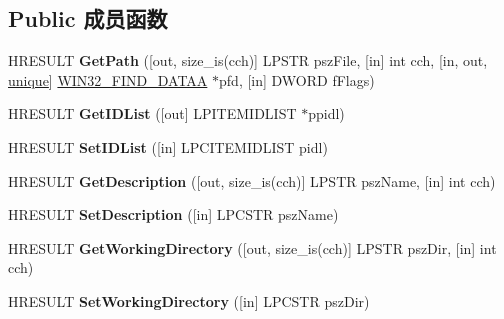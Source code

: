 \subsection*{Public 成员函数}
\begin{DoxyCompactItemize}
\item 
\mbox{\label{interface_i_shell_link_a_a39f61205c0352dbd8d60c6cbbc35930c}} 
H\+R\+E\+S\+U\+LT {\bfseries Get\+Path} (\mbox{[}out, size\+\_\+is(cch)\mbox{]} L\+P\+S\+TR psz\+File, \mbox{[}in\mbox{]} int cch, \mbox{[}in, out, \hyperlink{interfaceunique}{unique}\mbox{]} \hyperlink{struct_w_i_n32___f_i_n_d___d_a_t_a_a}{W\+I\+N32\+\_\+\+F\+I\+N\+D\+\_\+\+D\+A\+T\+AA} $\ast$pfd, \mbox{[}in\mbox{]} D\+W\+O\+RD f\+Flags)
\item 
\mbox{\label{interface_i_shell_link_a_a7089cc784350b3a8fe15ef9f508ab43a}} 
H\+R\+E\+S\+U\+LT {\bfseries Get\+I\+D\+List} (\mbox{[}out\mbox{]} L\+P\+I\+T\+E\+M\+I\+D\+L\+I\+ST $\ast$ppidl)
\item 
\mbox{\label{interface_i_shell_link_a_a708dd593d255147a3207a9daf727be41}} 
H\+R\+E\+S\+U\+LT {\bfseries Set\+I\+D\+List} (\mbox{[}in\mbox{]} L\+P\+C\+I\+T\+E\+M\+I\+D\+L\+I\+ST pidl)
\item 
\mbox{\label{interface_i_shell_link_a_a430c1d87198396dea6d8cc32d1e76d52}} 
H\+R\+E\+S\+U\+LT {\bfseries Get\+Description} (\mbox{[}out, size\+\_\+is(cch)\mbox{]} L\+P\+S\+TR psz\+Name, \mbox{[}in\mbox{]} int cch)
\item 
\mbox{\label{interface_i_shell_link_a_a891eb396593c044d80c9dbe9100059e4}} 
H\+R\+E\+S\+U\+LT {\bfseries Set\+Description} (\mbox{[}in\mbox{]} L\+P\+C\+S\+TR psz\+Name)
\item 
\mbox{\label{interface_i_shell_link_a_af77af8f207c7465b3e5ec8b86e7352a7}} 
H\+R\+E\+S\+U\+LT {\bfseries Get\+Working\+Directory} (\mbox{[}out, size\+\_\+is(cch)\mbox{]} L\+P\+S\+TR psz\+Dir, \mbox{[}in\mbox{]} int cch)
\item 
\mbox{\label{interface_i_shell_link_a_aeccccb06f2c6e8b88e714ab662279283}} 
H\+R\+E\+S\+U\+LT {\bfseries Set\+Working\+Directory} (\mbox{[}in\mbox{]} L\+P\+C\+S\+TR psz\+Dir)

\end{DoxyCompactItemize}
